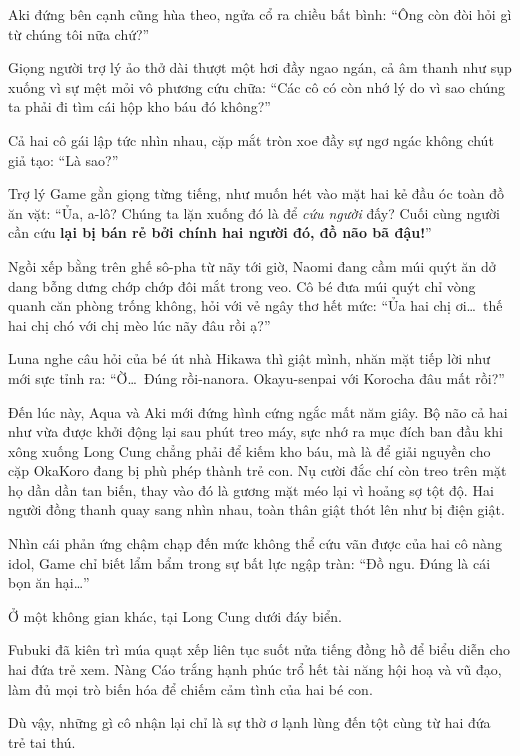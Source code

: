 \documentclass[../main.tex]{subfiles}
\begin{document}
Aki đứng bên cạnh cũng hùa theo, ngửa cổ ra chiều bất bình: ``Ông còn đòi hỏi gì từ chúng tôi nữa chứ?''

Giọng người trợ lý ảo thở dài thượt một hơi đầy ngao ngán, cả âm thanh như sụp xuống vì sự mệt mỏi vô phương cứu chữa: ``Các cô có còn nhớ lý do vì sao chúng ta phải đi tìm cái hộp kho báu đó không?''

Cả hai cô gái lập tức nhìn nhau, cặp mắt tròn xoe đầy sự ngơ ngác không chút giả tạo: ``Là sao?''

Trợ lý Game gằn giọng từng tiếng, như muốn hét vào mặt hai kẻ đầu óc toàn đồ ăn vặt: ``Ủa, a-lô? Chúng ta lặn xuống đó là để \emph{cứu người} đấy? Cuối cùng người cần cứu \textbf{lại bị bán rẻ bởi chính hai người đó, đồ não bã đậu!}''

Ngồi xếp bằng trên ghế sô-pha từ nãy tới giờ, Naomi đang cầm múi quýt ăn dở dang bỗng dưng chớp chớp đôi mắt trong veo. Cô bé đưa múi quýt chỉ vòng quanh căn phòng trống không, hỏi với vẻ ngây thơ hết mức: ``Ủa hai chị ơi\dots\ thế hai chị chó với chị mèo lúc nãy đâu rồi ạ?''

Luna nghe câu hỏi của bé út nhà Hikawa thì giật mình, nhăn mặt tiếp lời như mới sực tỉnh ra: ``Ờ\dots\ Đúng rồi-nanora. Okayu-senpai với Korocha đâu mất rồi?''

Đến lúc này, Aqua và Aki mới đứng hình cứng ngắc mất năm giây. Bộ não cả hai như vừa được khởi động lại sau phút treo máy, sực nhớ ra mục đích ban đầu khi xông xuống Long Cung chẳng phải để kiếm kho báu, mà là để giải nguyền cho cặp OkaKoro đang bị phù phép thành trẻ con. Nụ cười đắc chí còn treo trên mặt họ dần dần tan biến, thay vào đó là gương mặt méo lại vì hoảng sợ tột độ. Hai người đồng thanh quay sang nhìn nhau, toàn thân giật thót lên như bị điện giật.

Nhìn cái phản ứng chậm chạp đến mức không thể cứu vãn được của hai cô nàng idol, Game chỉ biết lẩm bẩm trong sự bất lực ngập tràn: ``Đồ ngu. Đúng là cái bọn ăn hại\dots''

\ct

Ở một không gian khác, tại Long Cung dưới đáy biển.

Fubuki đã kiên trì múa quạt xếp liên tục suốt nửa tiếng đồng hồ để biểu diễn cho hai đứa trẻ xem. Nàng Cáo trắng hạnh phúc trổ hết tài năng hội hoạ và vũ đạo, làm đủ mọi trò biến hóa để chiếm cảm tình của hai bé con.


Dù vậy, những gì cô nhận lại chỉ là sự thờ ơ lạnh lùng đến tột cùng từ hai đứa trẻ tai thú.
\end{document}
